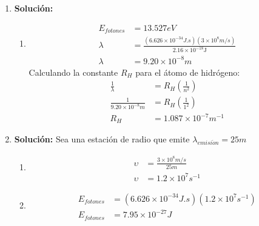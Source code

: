 \documentclass{article}
\begin{document}
\begin{enumerate}
    \item 
    \textbf{Solución:}
    \begin{enumerate}
        \item 
        \begin{equation*}
            \begin{split}
                E_{fotones} &= 13.527 eV\\
                \lambda  &= \frac{(6.626 \times 10^{-34}J.s)(3 \times 10^{8}m/s)}{2.16 \times 10^{-18}\si\joule}\\
                \lambda  &= 9.20 \times 10^{-8}m
            \end{split}
        \end{equation*}
        Calculando la constante $R_H$ para el \'atomo de hidr\'ogeno: 
        \begin{equation*}
            \begin{split}
                \frac{1}{\lambda} &= R_H \left( \frac{1}{n^{2}}\right)\\
                \frac{1}{9.20 \times 10^{-8}m} &= R_H \left( \frac{1}{1^{2}}\right)\\
                R_H &= 1.087 \times 10^{-7} m^{-1}
            \end{split}
        \end{equation*}
    \end{enumerate}
    
    
    \item 
    \textbf{Solución:}
    Sea una estaci\'on de radio que emite $\lambda_{emisi\acute{o}n} = 25m$
    \begin{enumerate}
        \item 
        \begin{equation*}
            \begin{split}
                \upsilon &= \frac{3 \times 10^{8}m/s}{25m}\\
                \upsilon &= 1.2 \times 10^{7}s^{-1}
            \end{split}
        \end{equation*}

        \item
        \begin{equation*}
            \begin{split}
                E_{fotones} &= (6.626 \times 10^{-34}J.s)(1.2 \times 10^{7}s^{-1})\\
                E_{fotones} &= 7.95 \times 10^{-27}J
            \end{split}
        \end{equation*}


\end{enumerate}
\end{enumerate}
\end{document}
